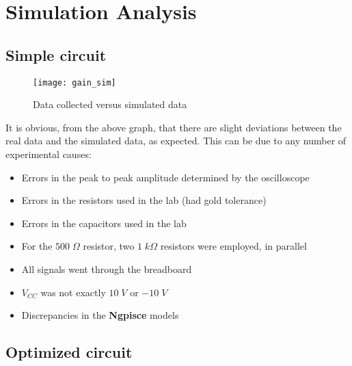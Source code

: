 \newpage

\section{Simulation Analysis}
\label{sec:simulation}

\subsection{Simple circuit}

\begin{figure}[H]
\centering
\texttt{[image: gain\_sim]}
\caption{Data collected versus simulated data}
\label{data_graph_sim}
\end{figure}

It is obvious, from the above graph, that there are slight deviations between the real data and the simulated data, as expected. This can be due to any number of experimental causes:

\begin{itemize}

\item Errors in the peak to peak amplitude determined by the oscilloscope

\item Errors in the resistors used in the lab (had gold tolerance)

\item Errors in the capacitors used in the lab

\item For the $500\;\Omega$ resistor, two $1\;k\Omega$ resistors were employed, in parallel

\item All signals went through the breadboard

\item $V_{CC}$ was not exactly $10\;V$ or $-10\;V$

\item Discrepancies in the {\bf Ngpisce} models

\end{itemize}

\subsection{Optimized circuit}
